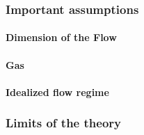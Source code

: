\subsubsection{Important assumptions}

\paragraph{Dimension of the Flow}

\paragraph{Gas}

\paragraph{Idealized flow regime}

\subsubsection{Limits of the theory}



